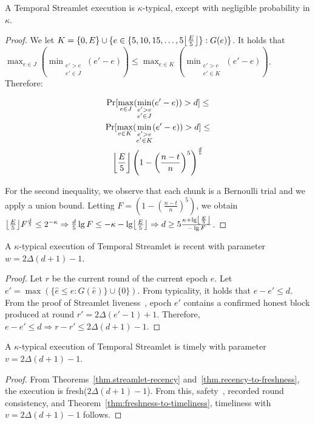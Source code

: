 \begin{lemma} \label{lem:honest-quintuple}
  A Temporal Streamlet execution is $\kappa$-typical, except with negligible probability in $\kappa$.
\end{lemma}
\begin{proof}
  We let $K = \{0, E\} \cup \{e \in \{5, 10, 15, \ldots, 5\floor*{\frac{E}{5}}\}: G(e)\}$.
  It holds that
  $\max_{e \in J}(\min_{\substack{e' > e \\ e' \in J}}(e' - e)) \leq \max_{e \in K}(\min_{\substack{e' > e \\ e' \in K}}(e' - e))$.
  Therefore:

  \begin{gather*}
      \Pr [\max_{e \in J}(\min_{\substack{e' > e \\ e' \in J}}(e' - e)) > d] \leq \\
      \Pr [\max_{e \in K}(\min_{\substack{e' > e \\ e' \in K}}(e' - e)) > d] \leq \\
      \floor*{\frac{E}{5}} \left(1 - \left(\frac{n - t}{n}\right)^5\right)^{\frac{d}{5}}
  \end{gather*}

  For the second inequality, we observe that each chunk is a Bernoulli trial and we
  apply a union bound.
  Letting $F = \left(1 - \left(\frac{n - t}{n}\right)^5\right)$, we obtain
  $\floor*{\frac{E}{5}} F^{\frac{d}{5}} \leq 2^{-\kappa} \Rightarrow
   \frac{d}{5} \lg F \leq -\kappa - \lg \floor*{\frac{E}{5}} \Rightarrow
   d \geq 5\frac{\kappa + \lg \floor*{\frac{E}{5}}}{- \lg F}
  $.
  \Qed
\end{proof}

\begin{theorem} \label{thm.streamlet-recency}
  A $\kappa$-typical execution of Temporal Streamlet is recent with parameter $w = 2\Delta (d + 1) - 1$.
\end{theorem}
\begin{proof}
  Let $r$ be the current round of the current epoch $e$.
  Let $e' = \max(\{\hat e \leq e: G(\hat e)\} \cup \{0\})$.
  From typicality, it holds that $e - e' \leq d$.
  From the proof of Streamlet liveness~\cite[Theorem 6]{streamlet}, epoch $e'$ contains
  a confirmed honest block produced at round $r' = 2\Delta (e' - 1) + 1$.
  Therefore, $e - e' \leq d
  \Rightarrow r - r' \leq 2\Delta (d + 1) - 1$.
  \Qed
\end{proof}

\begin{corollary}
  A $\kappa$-typical execution of Temporal Streamlet is timely with parameter $v = 2\Delta (d + 1) - 1$.
\end{corollary}
\begin{proof}
  From Theorems~\ref{thm.streamlet-recency} and~\ref{thm.recency-to-freshness},
  the execution is fresh($2\Delta (d + 1) - 1$).
  From this, safety~\cite[Theorem 3]{streamlet},
  recorded round consistency, and Theorem~\ref{thm:freshness-to-timeliness},
  timeliness with $v = 2\Delta (d + 1) - 1$ follows.
  \Qed
\end{proof}
